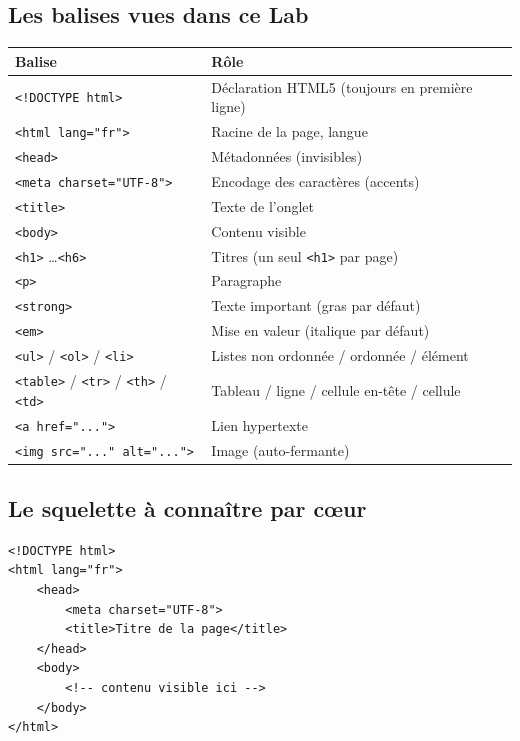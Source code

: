 \documentclass[11pt,a4paper]{article}
\begin{document}
\subsection{Les balises vues dans ce Lab}

\begin{center}
\begin{tabular}{@{}lp{8cm}@{}}
\toprule
\textbf{Balise} & \textbf{Rôle} \\
\midrule
\texttt{<!DOCTYPE html>}    & Déclaration HTML5 (toujours en première ligne) \\
\texttt{<html lang="fr">}   & Racine de la page, langue \\
\texttt{<head>}             & Métadonnées (invisibles) \\
\texttt{<meta charset="UTF-8">} & Encodage des caractères (accents) \\
\texttt{<title>}            & Texte de l'onglet \\
\texttt{<body>}             & Contenu visible \\
\texttt{<h1>} \ldots \texttt{<h6>} & Titres (un seul \texttt{<h1>} par page) \\
\texttt{<p>}                & Paragraphe \\
\texttt{<strong>}           & Texte important (gras par défaut) \\
\texttt{<em>}               & Mise en valeur (italique par défaut) \\
\texttt{<ul>} / \texttt{<ol>} / \texttt{<li>} & Listes non ordonnée / ordonnée / élément \\
\texttt{<table>} / \texttt{<tr>} / \texttt{<th>} / \texttt{<td>} & Tableau / ligne / cellule en-tête / cellule \\
\texttt{<a href="...">}     & Lien hypertexte \\
\texttt{<img src="..." alt="...">} & Image (auto-fermante) \\
\bottomrule
\end{tabular}
\end{center}

\subsection{Le squelette à connaître par cœur}

\begin{lstlisting}[language=HTML5]
<!DOCTYPE html>
<html lang="fr">
    <head>
        <meta charset="UTF-8">
        <title>Titre de la page</title>
    </head>
    <body>
        <!-- contenu visible ici -->
    </body>
</html>
\end{lstlisting}
\end{document}
